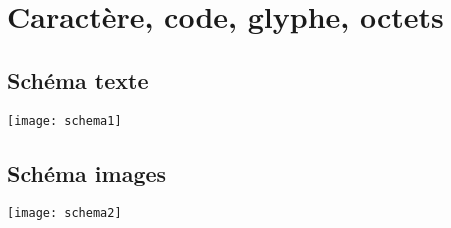 \section{Caractère, code, glyphe, octets}

\subsection{Schéma texte}
\frame
{
    \texttt{[image: schema1]}
}

\subsection{Schéma images}
\frame
{
    \texttt{[image: schema2]}
}

